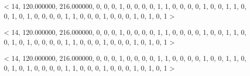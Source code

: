 < 14, 120.000000, 216.000000, 0, 0, 0, 1, 0, 0, 0, 0, 1, 1, 0, 0, 0, 0, 1, 0, 0, 1, 1, 0, 0, 1, 0, 1, 0, 0, 0, 0, 1, 1, 0, 0, 0, 1, 0, 0, 0, 1, 0, 1, 0, 1 > 

< 14, 120.000000, 216.000000, 0, 0, 0, 1, 0, 0, 0, 0, 1, 1, 0, 0, 0, 0, 1, 0, 0, 1, 1, 0, 0, 1, 0, 1, 0, 0, 0, 0, 1, 1, 0, 0, 0, 1, 0, 0, 0, 1, 0, 1, 0, 1 > 

< 14, 120.000000, 216.000000, 0, 0, 0, 1, 0, 0, 0, 0, 1, 1, 0, 0, 0, 0, 1, 0, 0, 1, 1, 0, 0, 1, 0, 1, 0, 0, 0, 0, 1, 1, 0, 0, 0, 1, 0, 0, 0, 1, 0, 1, 0, 1 > 